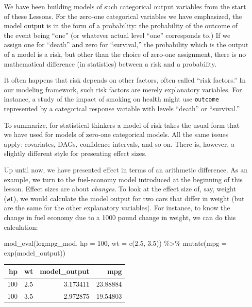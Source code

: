 \documentclass[
  letterpaper,
  DIV=11,
  numbers=noendperiod,
  oneside]{scrreprt}
\newenvironment{Shaded}{\begin{snugshade}}{\end{snugshade}}
\newcommand{\AttributeTok}[1]{\textcolor[rgb]{0.40,0.45,0.13}{#1}}
\newcommand{\DecValTok}[1]{\textcolor[rgb]{0.68,0.00,0.00}{#1}}
\newcommand{\FloatTok}[1]{\textcolor[rgb]{0.68,0.00,0.00}{#1}}
\newcommand{\FunctionTok}[1]{\textcolor[rgb]{0.28,0.35,0.67}{#1}}
\newcommand{\NormalTok}[1]{\textcolor[rgb]{0.00,0.23,0.31}{#1}}
\newcommand{\SpecialCharTok}[1]{\textcolor[rgb]{0.37,0.37,0.37}{#1}}
\begin{document}
{\begin{footnotesize}
We have been building models of such categorical output variables from
the start of these Lessons. For the zero-one categorical variables we
have emphasized, the model output is in the form of a probability: the
probability of the outcome of the event being ``one'' (or whatever
actual level ``one'' corresponds to.) If we assign one for ``death'' and
zero for ``survival,'' the probability which is the output of a model is
a risk, but other than the choice of zero-one assignment, there is no
mathematical difference (in statistics) between a risk and a
probability.

It often happens that risk depends on other factors, often called ``risk
factors.'' In our modeling framework, such risk factors are merely
explanatory variables. For instance, a study of the impact of smoking on
health might use \texttt{outcome} represented by a categorical response
variable with levels ``death'' or ``survival.''

To summarize, for statistical thinkers a model of risk takes the usual
form that we have used for models of zero-one categorical models. All
the same issues apply: covariates, DAGs, confidence intervals, and so
on. There is, however, a slightly different style for presenting effect
sizes.

Up until now, we have presented effect in terms of an arithmetic
difference. As an example, we turn to the fuel-economy model introduced
at the beginning of this lesson. Effect sizes are about \emph{changes}.
To look at the effect size of, say, weight (\texttt{wt}), we would
calculate the model output for two cars that differ in weight (but are
the same for the other explanatory variables). For instance, to know the
change in fuel economy due to a 1000 pound change in weight, we can do
this calculation:

\begin{Shaded}
\begin{Highlighting}[]
\FunctionTok{mod\_eval}\NormalTok{(logmpg\_mod, }\AttributeTok{hp =} \DecValTok{100}\NormalTok{, }\AttributeTok{wt =} \FunctionTok{c}\NormalTok{(}\FloatTok{2.5}\NormalTok{, }\FloatTok{3.5}\NormalTok{)) }\SpecialCharTok{\%\textgreater{}\%}
  \FunctionTok{mutate}\NormalTok{(}\AttributeTok{mpg =} \FunctionTok{exp}\NormalTok{(model\_output))}
\end{Highlighting}
\end{Shaded}

\ttfamily 
\begin{tabular}{rrrr}
\toprule
hp & wt & model\_output & mpg\\
\midrule
100 & 2.5 & 3.173411 & 23.88884\\
100 & 3.5 & 2.972875 & 19.54803\\
\bottomrule
\end{tabular} \normalfont
\bigskip


\end{footnotesize}}
\end{document}
